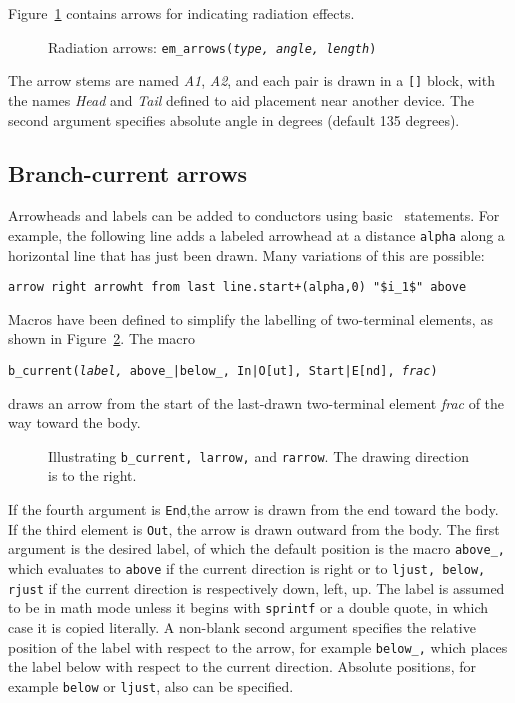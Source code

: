Figure~\ref{Emarrows} contains arrows for indicating
radiation effects.
\begin{figure}[h!t]
   
   \caption{Radiation arrows: {\tt em\_arrows({\sl type, angle, length})}}
   \label{Emarrows}
   \end{figure}
The arrow stems are named {\sl A1}, {\sl A2},
and each pair is drawn in a \verb|[]| block, with
the names {\sl Head} and {\sl Tail} defined to
aid placement near another device.  The second argument specifies
absolute angle in degrees (default 135 degrees).
\enlargethispage{\baselineskip}

\subsection{Branch-current arrows}
Arrowheads and labels can be added to conductors using basic
\pic\ statements.  For example, the following line adds a labeled
arrowhead at a distance {\tt alpha} along a horizontal line that has
just been drawn.  Many variations of this are possible:

  \verb|arrow right arrowht from last line.start+(alpha,0) "$i_1$" above|

Macros have been defined to simplify the labelling of two-terminal
elements, as shown in Figure~\ref{currents}.
The macro

   {\tt b\_current({\sl label,} above\_|below\_, In|O[ut], Start|E[nd],
   {\sl frac})}

\noindent
draws an arrow from the start of the last-drawn two-terminal element
{\sl frac} of the way toward the body.
\begin{figure}[h!t]
   
   \caption{Illustrating {\tt b\_current, larrow,} and {\tt rarrow}.
      The drawing direction is to the right.}
   \label{currents}
   \end{figure}

If the fourth argument is {\tt End},the arrow is drawn from the end
toward the body.
If the third element is {\tt Out}, the arrow is drawn outward from the body.
The first argument is the desired label, of which the default position is
the macro {\tt above\_,} which evaluates to {\tt above} if the current
direction is right or to {\tt ljust, below, rjust} if the current
direction is respectively down, left, up.  The label is assumed to be
in math mode unless it begins with {\tt sprintf} or a double quote, in which
case it is copied literally.  A non-blank second argument specifies the
relative position of the label with respect to the arrow, for example
{\tt below\_,} which places the label below with respect to the current
direction.  Absolute positions, for example {\tt below} or {\tt ljust},
also can be specified.

